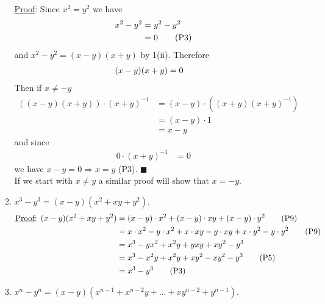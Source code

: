 \documentclass[12pt]{article}
\begin{document}
\begin{enumerate}
\begin{enumerate}
\underline{Proof}: Since $x^2 = y^2$ we have
\begin{align}
x^2 - y^2 &= y^2 - y^2 \notag \\
	       &= 0 \tag{P3}
\end{align}
and $x^2 - y^2 = (x - y)(x + y)$ by 1(ii). Therefore
\begin{align}
(x - y)(x + y) &= 0 \notag
\end{align}
Then if $x \neq -y$
\begin{align}
((x - y) (x + y)) \cdot (x + y)^{-1} &= (x - y) \cdot ((x + y) (x + y)^{-1}) \tag{P5}\\
						         &= (x - y) \cdot 1 \tag{P7}\\
					                  &= x - y \tag{P6}
\end{align}
and since
\begin{align}
0 \cdot (x + y)^{-1} &= 0 \tag{P9}
\end{align}
we have $x - y = 0 \Rightarrow x = y$ (P3). $\blacksquare$ \\
If we start with $x \neq y$ a similar proof will show that $x = -y$.

\item $x^3 - y^3 = (x - y)(x^2 + xy + y^2)$.
\begin{align}
\text{\underline{Proof}: } (x - y)(x^2 + xy + y^2) &= (x - y) \cdot x^2 + (x - y) \cdot xy + (x - y) \cdot y^2  \tag{P9}\\
									&= x \cdot x^2 - y \cdot x^2 + x \cdot xy - y \cdot xy + x \cdot y^2 - y \cdot y^2 \tag{P9}\\
									&= x^3 - yx^2 + x^2y + yxy + xy^2 - y^3 \notag \\
									&= x^3 - x^2y + x^2y + xy^2 - xy^2 - y^3 \tag{P5}\\
									&= x^3 - y^3 \tag{P3}
\end{align}

\item $x^n - y^n = (x - y)(x^{n-1} + x^{n-2}y + \dots + xy^{n-2} + y^{n-1})$.


\end{enumerate}
\end{enumerate}
\end{document}
